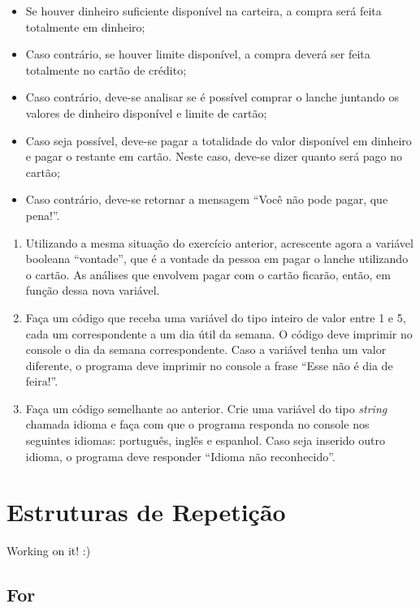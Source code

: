 \documentclass[
]{book}
\providecommand{\tightlist}{%
  \setlength{\itemsep}{0pt}\setlength{\parskip}{0pt}}
\begin{document}
\begin{itemize}
\tightlist
\item
  Se houver dinheiro suficiente disponível na carteira, a compra será feita totalmente em dinheiro;
\item
  Caso contrário, se houver limite disponível, a compra deverá ser feita totalmente no cartão de crédito;
\item
  Caso contrário, deve-se analisar se é possível comprar o lanche juntando os valores de dinheiro disponível e limite de cartão;
\item
  Caso seja possível, deve-se pagar a totalidade do valor disponível em dinheiro e pagar o restante em cartão. Neste caso, deve-se dizer quanto será pago no cartão;
\item
  Caso contrário, deve-se retornar a mensagem ``Você não pode pagar, que pena!''.
\end{itemize}

\begin{enumerate}
\def\labelenumi{\arabic{enumi}.}
\setcounter{enumi}{3}
\tightlist
\item
  Utilizando a mesma situação do exercício anterior, acrescente agora a variável booleana ``vontade'', que é a vontade da pessoa em pagar o lanche utilizando o cartão. As análises que envolvem pagar com o cartão ficarão, então, em função dessa nova variável.
\item
  Faça um código que receba uma variável do tipo inteiro de valor entre 1 e 5, cada um correspondente a um dia útil da semana. O código deve imprimir no console o dia da semana correspondente. Caso a variável tenha um valor diferente, o programa deve imprimir no console a frase ``Esse não é dia de feira!''.
\item
  Faça um código semelhante ao anterior. Crie uma variável do tipo \emph{string} chamada idioma e faça com que o programa responda no console nos seguintes idiomas: português, inglês e espanhol. Caso seja inserido outro idioma, o programa deve responder ``Idioma não reconhecido''.
\end{enumerate}

\hypertarget{estruturas-de-repetiuxe7uxe3o}{%
\chapter{Estruturas de Repetição}\label{estruturas-de-repetiuxe7uxe3o}}

Working on it! :)

\hypertarget{for}{%
\section{For}\label{for}}
\end{document}
